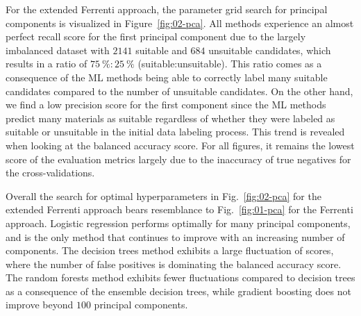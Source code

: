 \documentclass[superscriptaddress,unsortedaddress,
 amsmath,amssymb,
 aps,
]{revtex4-2}
\begin{document}
For the extended Ferrenti approach, the parameter grid search for principal components is visualized in Figure~\ref{fig:02-pca}. All methods experience an almost perfect recall score for the first principal component due to the largely imbalanced dataset with $2141$ suitable and $684$ unsuitable candidates, which results in  a ratio of $75 \ \% : 25 \ \%$ (suitable:unsuitable). This ratio comes as a consequence of the ML methods being able to correctly label many suitable candidates compared to the number of unsuitable candidates. 
On the other hand, we find a low precision score for the first component since the ML methods  predict many materials as suitable regardless of whether they were labeled as suitable or unsuitable in the initial data labeling process. 
This trend is revealed when looking at the balanced accuracy score. For all figures, it remains the lowest score of the evaluation metrics largely due to the inaccuracy of true negatives for the cross-validations.  


Overall the search for optimal hyperparameters in Fig.~\ref{fig:02-pca} for the extended Ferrenti approach bears resemblance to Fig.~\ref{fig:01-pca} for the Ferrenti approach. Logistic regression performs optimally for many principal components, and is the only method that continues to improve with an increasing number of components. The decision trees method exhibits a large fluctuation of scores, where the number of false positives is dominating the balanced accuracy score. The random forests method exhibits fewer fluctuations compared to decision trees as a consequence of the ensemble decision trees, while gradient boosting does not improve beyond $100$ principal components.

\begin{table}[t]
\centering
\caption{Optimal number of principal components and the respective scores (standard deviation) for each of the four ML methods logistic regression (LOG), decision trees (DT), random forests (RF) and gradient boosting (GB) in the extended Ferrenti approach, as visualized by the dash-dotted line in Fig.~\ref{fig:02-pca}.}
\label{tab:02-pc}
\noindent{}
\end{table}
\end{document}
